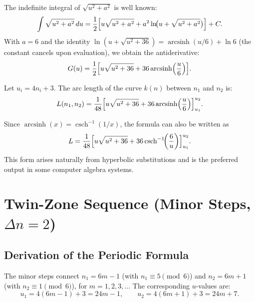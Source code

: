 The indefinite integral of $\sqrt{u^2 + a^2}$ is well known:
\[
  \int \sqrt{u^2 + a^2}\,du
  = \frac{1}{2}\Bigl[u\sqrt{u^2 + a^2}
    + a^2\ln\!\bigl(u + \sqrt{u^2+a^2}\bigr)\Bigr] + C.
\]
With $a = 6$ and the identity
$\ln(u + \sqrt{u^2+36}) = \operatorname{arcsinh}(u/6) + \ln 6$ (the constant
cancels upon evaluation), we obtain the antiderivative:
\[
  G(u) = \frac{1}{2}\Bigl[u\sqrt{u^2+36}
         + 36\operatorname{arcsinh}\!\left(\frac{u}{6}\right)\Bigr].
\]

\begin{theorem}\label{satz:bl_geschlossen}
Let $u_i = 4n_i + 3$. The arc length of the curve $k(n)$ between $n_1$
and $n_2$ is:
\begin{equation}\label{eq:bl_geschlossen}
  L(n_1, n_2)
  = \frac{1}{48}\Bigl[u\sqrt{u^2+36}
    + 36\operatorname{arcsinh}\!\left(\frac{u}{6}\right)
    \Bigr]_{u_1}^{u_2}.
\end{equation}
\end{theorem}

\begin{remark}
Since $\operatorname{arcsinh}(x) = \operatorname{csch}^{-1}(1/x)$, the
formula can also be written as
\[
  L = \frac{1}{48}\Bigl[u\sqrt{u^2+36}
    + 36\operatorname{csch}^{-1}\!\!\left(\frac{6}{u}\right)
    \Bigr]_{u_1}^{u_2}.
\]
This form arises naturally from hyperbolic substitutions and is
the preferred output in some computer algebra systems.
\end{remark}

\section{Twin-Zone Sequence (Minor Steps, \texorpdfstring{$\Delta n = 2$}{Δn = 2})}
\label{sec:twin_zone_bl}

\subsection{Derivation of the Periodic Formula}

The minor steps connect $n_1 = 6m-1$ (with $n_1 \equiv 5 \pmod{6}$)
and $n_2 = 6m+1$ (with $n_2 \equiv 1 \pmod{6}$), for $m = 1, 2, 3, \ldots$
The corresponding $u$-values are:
\[
  u_1 = 4(6m-1)+3 = 24m - 1,
  \qquad
  u_2 = 4(6m+1)+3 = 24m + 7.
\]

